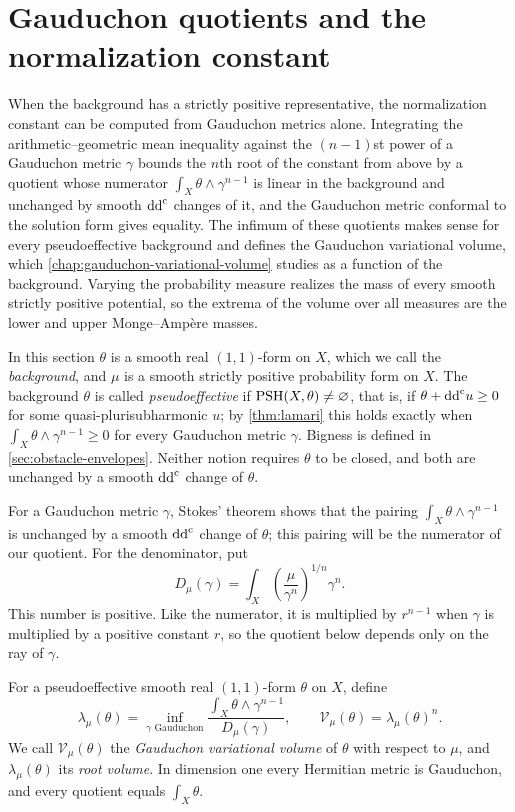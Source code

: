 \section{Gauduchon quotients and the normalization constant}\label{sec:gaud-volume-definition}
\label{sec:gaud-volume-positive-cone}

When the background has a strictly positive representative, the normalization constant can be computed from Gauduchon metrics alone. Integrating the arithmetic--geometric mean inequality against the $(n-1)$st power of a Gauduchon metric $\gamma$ bounds the $n$th root of the constant from above by a quotient whose numerator $\int_X\theta\wedge\gamma^{n-1}$ is linear in the background and unchanged by smooth $\mathrm{dd}^{\mathrm{c}}$ changes of it, and the Gauduchon metric conformal to the solution form gives equality. The infimum of these quotients makes sense for every pseudoeffective background and defines the Gauduchon variational volume, which \cref{chap:gauduchon-variational-volume} studies as a function of the background. Varying the probability measure realizes the mass of every smooth strictly positive potential, so the extrema of the volume over all measures are the lower and upper Monge--Amp\`ere masses.

In this section $\theta$ is a smooth real $(1,1)$-form on $X$, which we call the \emph{background}, and $\mu$ is a smooth strictly positive probability form on $X$. The background $\theta$ is called \emph{pseudoeffective} if $\mathrm{PSH}(X,\theta)\ne\varnothing$, that is, if $\theta+\mathrm{dd}^{\mathrm{c}} u\geq0$ for some quasi-plurisubharmonic $u$; by \cref{thm:lamari} this holds exactly when $\int_X\theta\wedge\gamma^{n-1}\geq0$ for every Gauduchon metric $\gamma$. Bigness is defined in \cref{sec:obstacle-envelopes}. Neither notion requires $\theta$ to be closed, and both are unchanged by a smooth $\mathrm{dd}^{\mathrm{c}}$ change of $\theta$.

For a Gauduchon metric $\gamma$, Stokes' theorem shows that the pairing $\int_X\theta\wedge\gamma^{n-1}$ is unchanged by a smooth $\mathrm{dd}^{\mathrm{c}}$ change of $\theta$; this pairing will be the numerator of our quotient. For the denominator, put
\[
 D_\mu(\gamma)=\int_X
           \left(\frac{\mu}{\gamma^n}\right)^{1/n}\gamma^n.
\]
This number is positive. Like the numerator, it is multiplied by $r^{n-1}$ when $\gamma$ is multiplied by a positive constant $r$, so the quotient below depends only on the ray of $\gamma$.

\begin{definition}\label{def:gaud-variational-volume}
For a pseudoeffective smooth real $(1,1)$-form $\theta$ on $X$, define
\[
 \lambda_\mu(\theta)=
 \inf_{\gamma\text{ Gauduchon}}
 \frac{\displaystyle\int_X\theta\wedge\gamma^{n-1}}
      {D_\mu(\gamma)},
 \qquad
 \mathcal V_\mu(\theta)=\lambda_\mu(\theta)^n.
\]
We call $\mathcal V_\mu(\theta)$ the \emph{Gauduchon variational volume} of $\theta$ with respect to $\mu$, and $\lambda_\mu(\theta)$ its \emph{root volume}. In dimension one every Hermitian metric is Gauduchon, and every quotient equals $\int_X\theta$.
\end{definition}

